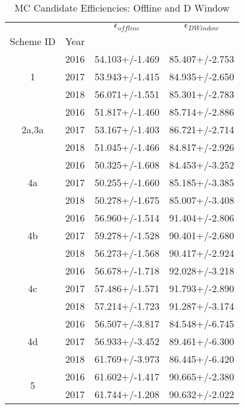 \begin{table}
\centering
\caption{MC Candidate Efficiencies: Offline and D Window}
\label{tab:can_offdwin_1}
\begin{tabular}{cccc}
\toprule
   &      & $\epsilon_{offline}$ & $\epsilon_{D Window}$ \\
Scheme ID & Year &                      &                       \\
\midrule
\multirow{3}{*}{1} & 2016 &       54.103+/-1.469 &        85.407+/-2.753 \\
   & 2017 &       53.943+/-1.415 &        84.935+/-2.650 \\
   & 2018 &       56.071+/-1.551 &        85.301+/-2.783 \\
\cline{1-4}
\multirow{3}{*}{2a,3a} & 2016 &       51.817+/-1.460 &        85.714+/-2.886 \\
   & 2017 &       53.167+/-1.403 &        86.721+/-2.714 \\
   & 2018 &       51.045+/-1.466 &        84.817+/-2.926 \\
\cline{1-4}
\multirow{3}{*}{4a} & 2016 &       50.325+/-1.608 &        84.453+/-3.252 \\
   & 2017 &       50.255+/-1.660 &        85.185+/-3.385 \\
   & 2018 &       50.278+/-1.675 &        85.007+/-3.408 \\
\cline{1-4}
\multirow{3}{*}{4b} & 2016 &       56.960+/-1.514 &        91.404+/-2.806 \\
   & 2017 &       59.278+/-1.528 &        90.401+/-2.680 \\
   & 2018 &       56.273+/-1.568 &        90.417+/-2.924 \\
\cline{1-4}
\multirow{3}{*}{4c} & 2016 &       56.678+/-1.718 &        92.028+/-3.218 \\
   & 2017 &       57.486+/-1.571 &        91.793+/-2.890 \\
   & 2018 &       57.214+/-1.723 &        91.287+/-3.174 \\
\cline{1-4}
\multirow{3}{*}{4d} & 2016 &       56.507+/-3.817 &        84.548+/-6.745 \\
   & 2017 &       56.933+/-3.452 &        89.461+/-6.300 \\
   & 2018 &       61.769+/-3.973 &        86.445+/-6.420 \\
\cline{1-4}
\multirow{3}{*}{5} & 2016 &       61.602+/-1.417 &        90.665+/-2.380 \\
   & 2017 &       61.744+/-1.208 &        90.632+/-2.022 \\

\end{tabular}
\end{table}
